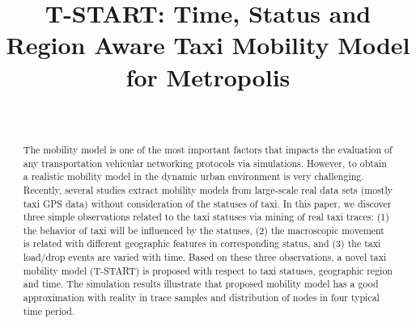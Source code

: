 \documentclass[10pt,journal,compsocconf,letterpaper]{IEEEtran}
\begin{document}
\title{T-START: Time, Status and Region Aware Taxi Mobility Model for Metropolis}

\author{\\
}
\maketitle

\begin{abstract}
The mobility model is one of the most important factors that impacts the evaluation of any transportation vehicular networking protocols via simulations. However, to obtain a realistic mobility model in the dynamic urban environment is very challenging. Recently, several studies extract mobility models from large-scale real data sets (mostly taxi GPS data) without consideration of the statuses of taxi. In this paper, we discover three simple observations related to the taxi statuses via mining of real taxi traces: (1) the behavior of taxi will be influenced by the statuses, (2) the macroscopic movement is related with different geographic features in corresponding status, and (3) the taxi load/drop events are varied with time. 
Based on these three observations, a novel taxi mobility model (T-START) is proposed with respect to taxi statuses, geographic region and time. The simulation results illustrate that proposed mobility model has a good approximation with reality in trace samples and distribution of nodes in four typical time period.
\end{abstract}
\end{document}
